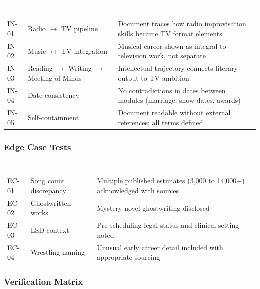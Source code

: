 \documentclass[11pt,letterpaper]{article}
\newcommand{\tableheader}[1]{\textbf{\sffamily\textcolor{white}{#1}}}
\begin{document}
\begin{center}
\begin{tabularx}{\textwidth}{C{1.2cm}L{3cm}X}
\toprule
{}
\tableheader{ID} & \tableheader{Verifies} & \tableheader{Expected} \\
\midrule
IN-01 & Radio $\rightarrow$ TV pipeline & Document traces how radio improvisation skills became TV format elements \\
IN-02 & Music $\leftrightarrow$ TV integration & Musical career shown as integral to television work, not separate \\
IN-03 & Reading $\rightarrow$ Writing $\rightarrow$ Meeting of Minds & Intellectual trajectory connects literary output to TV ambition \\
IN-04 & Date consistency & No contradictions in dates between modules (marriage, show dates, awards) \\
IN-05 & Self-containment & Document readable without external references; all terms defined \\
\bottomrule
\end{tabularx}
\end{center}

\subsubsection{Edge Case Tests}

\begin{center}
\begin{tabularx}{\textwidth}{C{1.2cm}L{3cm}X}
\toprule
{}
\tableheader{ID} & \tableheader{Verifies} & \tableheader{Expected} \\
\midrule
EC-01 & Song count discrepancy & Multiple published estimates (3,000 to 14,000+) acknowledged with sources \\
EC-02 & Ghostwritten works & Mystery novel ghostwriting disclosed \\
EC-03 & LSD context & Pre-scheduling legal status and clinical setting noted \\
EC-04 & Wrestling naming & Unusual early career detail included with appropriate sourcing \\
\bottomrule
\end{tabularx}
\end{center}

\subsubsection{Verification Matrix}
\end{document}
